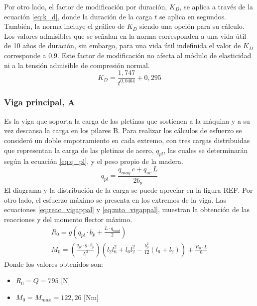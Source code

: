 Por otro lado, el factor de modificación por duración, $K_D$, se aplica a través de la ecuación \ref{eq:k_d}, donde la duración de la carga $t$ se aplica en segundos. También, la norma incluye el gráfico de $K_D$ siendo una opción para su cálculo. Los valores admisibles que se señalan en la norma corresponden a una vida útil de 10 años de duración, sin embargo, para una vida útil indefinida el valor de $K_D$ corresponde a 0,9. Este factor de modificación no afecta al módulo de elasticidad ni a la tensión admisible de compresión normal.
\begin{equation} \label{eq:k_d}
	K_D = \frac{1,747}{t^{0,0464}} + 0,295
\end{equation}

\subsubsection{Viga principal, A}
Es la viga que soporta la carga de las pletinas que sostienen a la máquina y a su vez descansa la carga en los pilares B. Para realizar los cálculos de esfuerzo se consideró un doble empotramiento en cada extremo, con tres cargas distribuidas que representan la carga de las pletinas de acero, $q_{pl}$, las cuales se determinarán según la ecuación \ref{eq:q_pl}, y el peso propio de la madera.
\begin{equation}\label{eq:q_pl}
	q_{pl} = \frac{q_{maq}\,c + q_{ac}\,L}{2b_p}
\end{equation}
El diagrama y la distribución de la carga se puede apreciar en la figura REF. Por otro lado, el esfuerzo máximo se presenta en los extremos de la viga. Las ecuaciones \ref{eq:reac_vigappal} y \ref{eq:mto_vigappal}, muestran la obtención de las reacciones y del momento flector máximo.
\begin{subequations}
\begin{gather}
	R_0 = g \left( q_{pl}\cdot b_p + \frac{L\cdot q_{mad}}{2}\right) \label{eq:reac_vigappal}\\
	M_0 = \left(\frac{q_{pl}\cdot g\cdot b_p}{L^2}\right) \left(l_2 l_6^2 + l_6 l_2^2 - \frac{b_p^2}{12}\left( l_6 + l_2\right) \right) + \frac{R_0\cdot L}{6} \label{eq:mto_vigappal} 
\end{gather}
\end{subequations}
Donde los valores obtenidos son:
\begin{itemize}
	\item $R_0 = Q = 795$ [N]
	\item $M_0 = M_{max} = 122,26$ [Nm]
\end{itemize}
